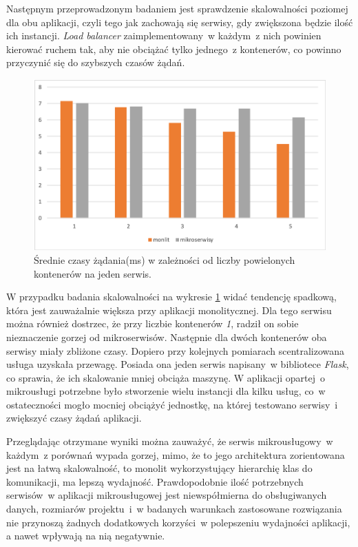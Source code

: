 Następnym przeprowadzonym badaniem jest sprawdzenie skalowalności poziomej dla obu aplikacji, czyli tego jak zachowają się serwisy, gdy zwiększona będzie ilość ich instancji. \textit{Load balancer} zaimplementowany~w każdym~z nich powinien kierować ruchem tak, aby nie obciążać tylko jednego~z kontenerów, co powinno przyczynić się do szybszych czasów żądań\cite{Rodger:2019}.


\begin{figure}[h!]
	\centering
		\includegraphics[width=12cm]{Rysunki/Rozdzial7/kontenery.png}
		\caption{Średnie czasy żądania(ms) w zależności od liczby powielonych kontenerów na jeden serwis.}
		\label{fig:kontenery}
	\end{figure}
	
W przypadku	badania skalowalności na wykresie \ref{fig:kontenery} widać tendencję spadkową, która jest zauważalnie większa przy aplikacji monolitycznej. Dla tego serwisu można również dostrzec, że przy liczbie kontenerów \textit{1}, radził on sobie nieznaczenie gorzej od mikroserwisów. Następnie dla dwóch kontenerów oba serwisy miały zbliżone czasy. Dopiero przy kolejnych pomiarach scentralizowana usługa uzyskała przewagę. Posiada ona jeden serwis napisany~w bibliotece \textit{Flask}, co sprawia, że ich skalowanie mniej obciąża maszynę. W aplikacji opartej~o mikrousługi potrzebne było stworzenie wielu instancji dla kilku usług, co~w ostateczności mogło mocniej obciążyć jednostkę, na której testowano serwisy~i zwiększyć czasy żądań aplikacji. 

Przeglądając otrzymane wyniki można zauważyć, że serwis mikrousługowy~w każdym~z porównań wypada gorzej, mimo, że to jego architektura zorientowana jest na łatwą skalowalność\cite{Rodger:2019}, to monolit wykorzystujący hierarchię klas do komunikacji, ma lepszą wydajność. Prawdopodobnie ilość potrzebnych serwisów~w aplikacji mikrousługowej jest niewspółmierna do obsługiwanych danych, rozmiarów projektu~i~w badanych warunkach zastosowane rozwiązania nie przynoszą żadnych dodatkowych korzyści~w polepszeniu wydajności aplikacji, a nawet wpływają na nią negatywnie.

